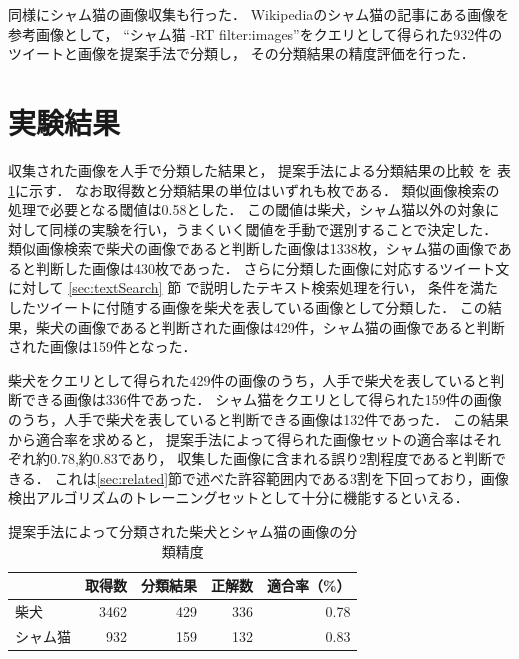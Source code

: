 同様にシャム猫の画像収集も行った．
Wikipediaのシャム猫の記事にある画像を参考画像として，
``シャム猫 -RT filter:images''をクエリとして得られた932件のツイートと画像を提案手法で分類し，
その分類結果の精度評価を行った．

\section{実験結果}
\label{sec:expresult}

収集された画像を人手で分類した結果と，
提案手法による分類結果の比較
を
表\ref{tab:result-shiba}に示す．
なお取得数と分類結果の単位はいずれも枚である．
%
類似画像検索の処理で必要となる閾値は0.58とした．
この閾値は柴犬，シャム猫以外の対象に対して同様の実験を行い，うまくいく閾値を手動で選別することで決定した．
類似画像検索で柴犬の画像であると判断した画像は1338枚，シャム猫の画像であると判断した画像は430枚であった．
%
さらに分類した画像に対応するツイート文に対して
\ref{sec:textSearch}
節
で説明したテキスト検索処理を行い，
条件を満たしたツイートに付随する画像を柴犬を表している画像として分類した．
この結果，柴犬の画像であると判断された画像は429件，シャム猫の画像であると判断された画像は159件となった．


柴犬をクエリとして得られた429件の画像のうち，人手で柴犬を表していると判断できる画像は336件であった．
シャム猫をクエリとして得られた159件の画像のうち，人手で柴犬を表していると判断できる画像は132件であった．
この結果から適合率を求めると，
提案手法によって得られた画像セットの適合率はそれぞれ約0.78,約0.83であり，
収集した画像に含まれる誤り2割程度であると判断できる．
これは\ref{sec:related}節で述べた許容範囲内である3割を下回っており，画像検出アルゴリズムのトレーニングセットとして十分に機能するといえる．


\begin{table}[tb]
\begin{center}
\caption{提案手法によって分類された柴犬とシャム猫の画像の分類精度}
\label{tab:result-shiba}
\begin{tabular}{|l|r|r|r|r|}\hline
& 取得数& 分類結果& 正解数& 適合率（\%） \\ \hline \hline

柴犬& 3462& 429& 336& 0.78 \\ \hline
シャム猫& 932& 159& 132& 0.83 \\ \hline
\end{tabular}
\end{center}
\end{table}

